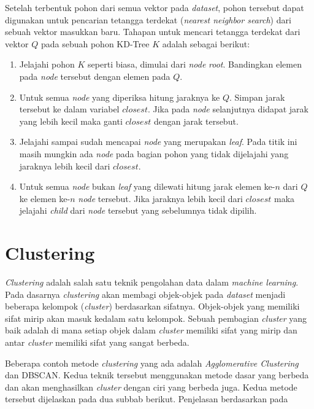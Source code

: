 Setelah terbentuk pohon dari semua vektor pada \textit{dataset}, pohon tersebut dapat digunakan untuk pencarian tetangga terdekat (\textit{nearest neighbor search}) dari sebuah vektor masukkan baru. Tahapan untuk mencari tetangga terdekat dari vektor $Q$ pada sebuah pohon KD-Tree $K$ adalah sebagai berikut:
\begin{enumerate}
	\item Jelajahi pohon $K$ seperti biasa, dimulai dari \textit{node} \textit{root}. Bandingkan elemen pada \textit{node} tersebut dengan elemen pada $Q$. 
	\item Untuk semua \textit{node} yang diperiksa hitung jaraknya ke $Q$. Simpan jarak tersebut ke dalam variabel $closest$. Jika pada \textit{node} selanjutnya didapat jarak yang lebih kecil maka ganti $closest$ dengan jarak tersebut.
	\item Jelajahi sampai sudah mencapai \textit{node} yang merupakan \textit{leaf}. Pada titik ini masih mungkin ada \textit{node} pada bagian pohon yang tidak dijelajahi yang jaraknya lebih kecil dari $closest$.
	\item Untuk semua \textit{node} bukan \textit{leaf} yang dilewati hitung jarak elemen ke-$n$ dari $Q$ ke elemen ke-$n$ \textit{node} tersebut. Jika jaraknya lebih kecil dari $closest$ maka jelajahi \textit{child} dari \textit{node} tersebut yang sebelumnya tidak dipilih.
\end{enumerate}

\section{Clustering}
\label{sec:clustering}
\textit{Clustering} adalah salah satu teknik pengolahan data dalam \textit{machine learning}. Pada dasarnya \textit{clustering} akan membagi objek-objek pada \textit{dataset}  menjadi beberapa kelompok (\textit{cluster}) berdasarkan sifatnya. Objek-objek yang memiliki sifat mirip akan masuk kedalam satu kelompok. Sebuah pembagian \textit{cluster} yang baik adalah di mana setiap objek dalam \textit{cluster} memiliki sifat yang mirip dan antar \textit{cluster} memiliki sifat yang sangat berbeda.

Beberapa contoh metode \textit{clustering} yang ada adalah \textit{Agglomerative Clustering} dan DBSCAN. Kedua teknik tersebut menggunakan metode dasar yang berbeda dan akan menghasilkan \textit{cluster} dengan ciri yang berbeda juga. Kedua metode tersebut dijelaskan pada dua subbab berikut. Penjelasan berdasarkan pada~\cite{han2011data}


